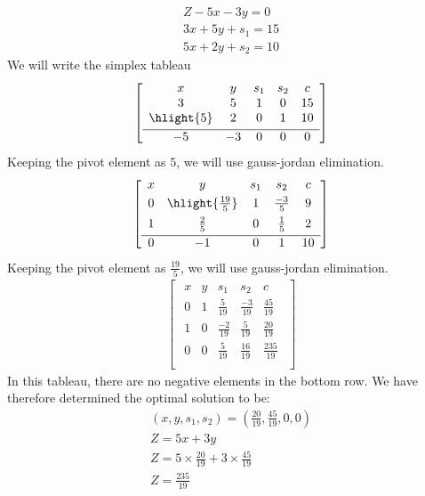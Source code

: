 \begin{align}
Z-5x-3y=0\\
3x+5y+s_1=15\\
5x+2y+s_2=10
\end{align}
We will write the simplex tableau
\begin{align}
\begin{bmatrix}
\begin{array}{ccccc}
  x & y & s_1 & s_2 & c  \\ 
  3 & 5 & 1 & 0 & 15 \\ 
  \hlight{5} & 2 & 0 & 1 & 10  \\[0.1cm] \hline
  -5 & -3 & 0 & 0 & 0 \\
\end{array}
\end{bmatrix}
\end{align}
Keeping the pivot element as $5$, we will use gauss-jordan elimination.
\begin{align}
\begin{bmatrix}
\begin{array}{ccccc}
  x & y & s_1 & s_2 & c  \\[0.1cm] 
  0 & \hlight{\frac{19}{5}} & 1 & \frac{-3}{5} & 9 \\[0.15cm] 
  1 & \frac{2}{5} & 0 & \frac{1}{5} & 2  \\[0.1cm] \hline
  0 & -1 & 0 & 1 & 10 \\
\end{array}
\end{bmatrix}
\end{align}
Keeping the pivot element as $\frac{19}{5}$, we will use gauss-jordan elimination.
\begin{align}
\begin{bmatrix}
\begin{array}{ccccc}
  x & y & s_1 & s_2 & c  \\ 
  0 & 1 & \frac{5}{19} & \frac{-3}{19} & \frac{45}{19} \\ 
  1 & 0 & \frac{-2}{19} & \frac{5}{19} & \frac{20}{19}  \\[0.1cm] \hline 
  0 & 0 & \frac{5}{19} & \frac{16}{19} & \frac{235}{19} \\
\end{array}
\end{bmatrix}
\end{align}
In this tableau, there are no negative elements in the bottom row. We have therefore determined the optimal solution to be:
\begin{align}
(x,y,s_1,s_2)=\left(\frac{20}{19},\frac{45}{19},0,0\right)\\
Z=5x+3y\\
Z=5\times\frac{20}{19}+3\times\frac{45}{19}\\
Z=\frac{235}{19}
\end{align}
